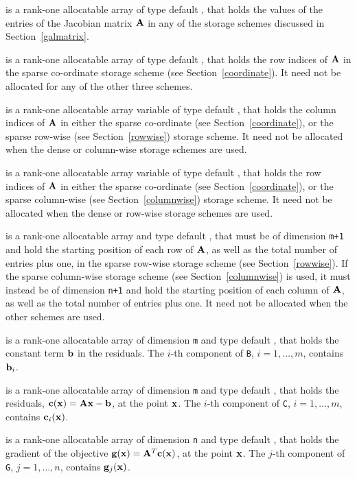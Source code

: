 \documentclass{galahad}
\begin{document}
\begin{description}
\begin{description}
 is a rank-one allocatable array of type default \realdp, that holds
the values of the entries of the Jacobian matrix ${\mathbf{A}}$ in any of the
storage schemes discussed in Section~\ref{galmatrix}.

 is a rank-one allocatable array of type default \integer,
that holds the row indices of ${\mathbf{A}}$ in the sparse co-ordinate storage
scheme (see Section~\ref{coordinate}).
It need not be allocated for any of the other three schemes.

 is a rank-one allocatable array variable of type default \integer,
that holds the column indices of ${\mathbf{A}}$ in either the sparse co-ordinate
(see Section~\ref{coordinate}), or the sparse row-wise
(see Section~\ref{rowwise}) storage scheme.
It need not be allocated when the dense or column-wise storage schemes are used.

 is a rank-one allocatable array variable of type default \integer,
that holds the row indices of ${\mathbf{A}}$ in either the sparse co-ordinate
(see Section~\ref{coordinate}), or the sparse column-wise
(see Section~\ref{columnwise}) storage scheme.
It need not be allocated when the dense or row-wise storage schemes are used.

 is a rank-one allocatable array and type default \integer,
that must be of dimension {\tt m+1}
and hold the starting position of each row of ${\mathbf{A}}$, as well
as the total number of entries plus one, in the sparse row-wise storage
scheme (see Section~\ref{rowwise}).
If the sparse column-wise storage scheme (see Section~\ref{columnwise})
is used, it must instead be of dimension {\tt n+1}
and hold the starting position of each column of ${\mathbf{A}}$, as well
as the total number of entries plus one.
It need not be allocated when the
other schemes are used.

\end{description}

 is a rank-one allocatable array of dimension {\tt m} and type
default \realdp, that holds the constant term ${\mathbf{b}}$ in the residuals.
The $i$-th component of {\tt B}, $i = 1, \ldots, m$, contains ${\mathbf{b}}_{i}$.

 is a rank-one allocatable array of dimension {\tt m} and type
default \realdp, that holds the residuals, ${\mathbf{c}}({\mathbf{x}}) = {\mathbf{A}} {\mathbf{x}} - {\mathbf{b}}$,
at the point ${\mathbf{x}}$. The $i$-th component of
{\tt C}, $i = 1, \ldots, m$, contains ${\mathbf{c}}_{i}({\mathbf{x}})$.

 is a rank-one allocatable array of dimension {\tt n} and type
default \realdp, that holds the gradient of the objective
 ${\mathbf{g}}({\mathbf{x}}) = {\mathbf{A}}^T {\mathbf{c}}({\mathbf{x}})$, at the point ${\mathbf{x}}$. The $j$-th component of
{\tt G}, $j = 1, \ldots, n$, contains ${\mathbf{g}}_{j}({\mathbf{x}})$.


\end{description}
\end{document}
